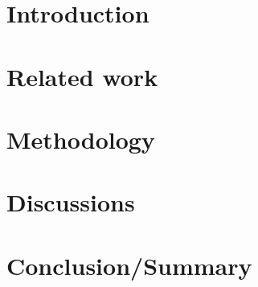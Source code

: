 \documentclass[MACS,english,a4paper,oneside]{ntnuthesis/ntnuthesis}
\begin{document}
	
	\makefrontpages %
	
	
	
	\tableofcontents
	
	\hypersetup{pageanchor=true}
	
	\listoffigures
	\listoftables
	
	
	\chapter{Introduction}
	 
	
	\chapter{Related work}
	 
	
	\chapter{Methodology}
	 
	
	\chapter{Discussions}
	 
	
	\chapter{Conclusion/Summary}
	 
	
	
	\clearpage
	\printbibliography
	
	
\end{document}
